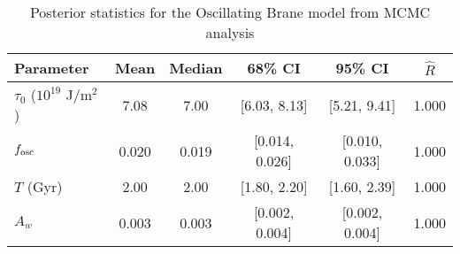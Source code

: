 \begin{table}[htbp]
\centering
\caption{Posterior statistics for the Oscillating Brane model from MCMC analysis}
\label{tab:posterior}
\begin{tabular}{lccccc}
\toprule
Parameter & Mean & Median & 68\% CI & 95\% CI & $\hat{R}$ \\
\midrule
$\tau_0$ ($10^{19}$ J/m$^2$) & 7.08 & 7.00 & [6.03, 8.13] & [5.21, 9.41] & 1.000 \\
$f_{\rm osc}$ & 0.020 & 0.019 & [0.014, 0.026] & [0.010, 0.033] & 1.000 \\
$T$ (Gyr) & 2.00 & 2.00 & [1.80, 2.20] & [1.60, 2.39] & 1.000 \\
$A_w$ & 0.003 & 0.003 & [0.002, 0.004] & [0.002, 0.004] & 1.000 \\
\bottomrule
\end{tabular}
\end{table}